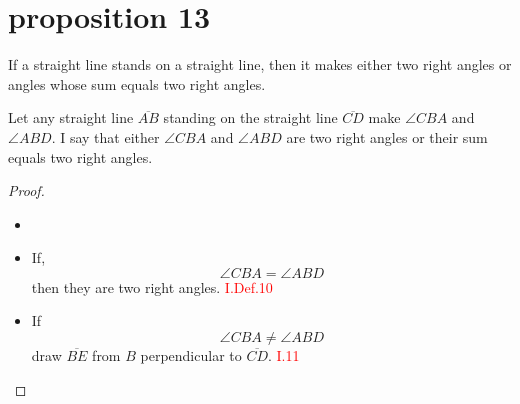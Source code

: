
\section*{proposition 13}

\begin{thm}
If a straight line stands on a straight line, then it makes either two right angles or angles whose sum equals two right angles.
\end{thm}

Let any straight line $\overline{AB}$ standing on the straight line $\overline{CD}$ make $\angle{CBA}$ and $\angle{ABD}$. I say that either $\angle{CBA}$ and $\angle{ABD}$ are two right angles or their sum equals two right angles.

\begin{proof}

\begin{itemize}

	\item[]

   	 \item If, 
   	 \[\angle{CBA} = \angle{ABD}\]
   	 then they are two right angles. \hfill\textcolor{red}{I.Def.10}
    
   	 \item If 
   	 \[\angle{CBA} \neq \angle{ABD}\]
    	 draw $\overline{BE}$ from $B$ perpendicular to $\overline{CD}$. \hfill\textcolor{red}{I.11}
    
  \begin{figure}[H]
	\begin{subfigure}{0.35\textwidth}
		\caption{}
	\end{subfigure}
	\begin{subfigure}{0.35\textwidth}
		\caption{}
	\end{subfigure}
	\caption{}
\end{figure}  


\end{itemize}
\end{proof}
